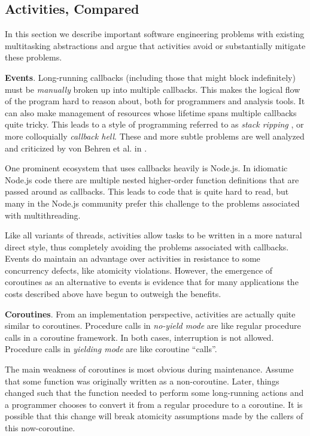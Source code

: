 \documentclass[9pt,preprint]{sigplanconf}
\begin{document}
\subsection{Activities, Compared}

In this section we describe important software engineering problems with existing multitasking abstractions and argue that activities avoid or substantially mitigate these problems.

\textbf{Events}.
Long-running callbacks (including those that might block indefinitely) must be \emph{manually} broken up into multiple callbacks.
This makes the logical flow of the program hard to reason about, both for programmers and analysis tools.
It can also make management of resources whose lifetime spans multiple callbacks quite tricky.
This leads to a style of programming referred to as \emph{stack ripping} \cite{Adya2002}, or more colloquially \emph{callback hell}.
These and more subtle problems are well analyzed and criticized by von Behren et al. in \cite{Behren2003a}.

One prominent ecosystem that uses callbacks heavily is Node.js.
In idiomatic Node.js code there are multiple nested higher-order function definitions that are passed around as callbacks.
This leads to code that is quite hard to read, but many in the Node.js community prefer this challenge to the problems associated with multithreading.

Like all variants of threads, activities allow tasks to be written in a more natural direct style, thus completely avoiding the problems associated with callbacks.
Events do maintain an advantage over activities in resistance to some concurrency defects, like atomicity violations.
However, the emergence of coroutines as an alternative to events is evidence that for many applications the costs described above have begun to outweigh the benefits.

\textbf{Coroutines}.
From an implementation perspective, activities are actually quite similar to coroutines.
Procedure calls in \emph{no-yield mode} are like regular procedure calls in a coroutine framework.
In both cases, interruption is not allowed.
Procedure calls in \emph{yielding mode} are like coroutine ``calls''.

The main weakness of coroutines is most obvious during maintenance.
Assume that some function was originally written as a non-coroutine.
Later, things changed such that the function needed to perform some long-running actions and a programmer chooses to convert it from a regular procedure to a coroutine.
It is possible that this change will break atomicity assumptions made by the callers of this now-coroutine.
\end{document}
